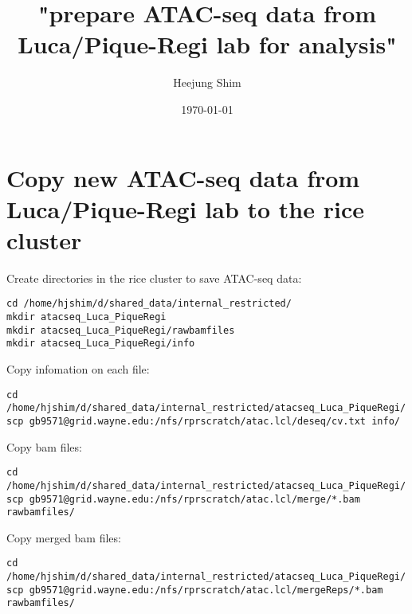 \documentclass[11pt]{article}
\author{Heejung Shim}
\date{\today}
\title{"prepare ATAC-seq data from Luca/Pique-Regi lab for analysis"}
\begin{document}
\maketitle
\tableofcontents


\section{Copy new ATAC-seq data from Luca/Pique-Regi lab to the rice cluster}
\label{sec-1}

Create directories in the rice cluster to save ATAC-seq data:
\begin{lstlisting}
cd /home/hjshim/d/shared_data/internal_restricted/
mkdir atacseq_Luca_PiqueRegi
mkdir atacseq_Luca_PiqueRegi/rawbamfiles
mkdir atacseq_Luca_PiqueRegi/info
\end{lstlisting}

Copy infomation on each file:
\begin{lstlisting}
cd /home/hjshim/d/shared_data/internal_restricted/atacseq_Luca_PiqueRegi/
scp gb9571@grid.wayne.edu:/nfs/rprscratch/atac.lcl/deseq/cv.txt info/
\end{lstlisting}

Copy bam files:
\begin{lstlisting}
cd /home/hjshim/d/shared_data/internal_restricted/atacseq_Luca_PiqueRegi/
scp gb9571@grid.wayne.edu:/nfs/rprscratch/atac.lcl/merge/*.bam rawbamfiles/
\end{lstlisting}

Copy merged bam files:
\begin{lstlisting}
cd /home/hjshim/d/shared_data/internal_restricted/atacseq_Luca_PiqueRegi/
scp gb9571@grid.wayne.edu:/nfs/rprscratch/atac.lcl/mergeReps/*.bam rawbamfiles/
\end{lstlisting}
\end{document}
